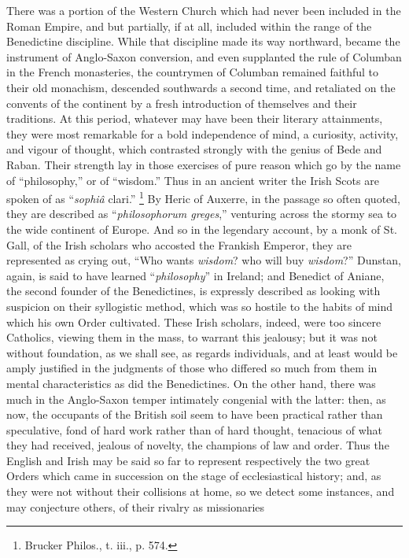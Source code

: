 There was a portion of the Western Church which had never been
included in the Roman Empire, and but partially, if at all, included
within the range of the Benedictine discipline. While that discipline
made its way northward, became the instrument of Anglo-Saxon
conversion, and even supplanted the rule of Columban in the French
monasteries, the countrymen of Columban remained faithful to their old
monachism, descended southwards a second time, and retaliated on the
convents of the continent by a fresh introduction of themselves and
their traditions. At this period, whatever may have been their
literary attainments, they were most remarkable for a bold
independence of mind, a curiosity, activity, and vigour of thought,
which contrasted strongly with the genius of Bede and Raban. Their
strength lay in those exercises of pure reason which go by the name of
``philosophy,'' or of ``wisdom.'' Thus in an ancient
writer the Irish Scots are spoken of as ``\emph{sophiâ} clari.''
\footnote{Brucker
Philos., t. iii., p. 574.} By Heric of Auxerre,
in the passage so often quoted, they are described as ``\emph{philosophorum
greges},'' venturing across the stormy sea to the wide
continent of Europe. And so in the legendary account, by a monk of St.
Gall, of the Irish scholars who accosted the Frankish Emperor, they
are represented as crying out, ``Who wants \emph{wisdom}? who will
buy \emph{wisdom}?'' Dunstan, again, is said to have learned
``\emph{philosophy}'' in Ireland; and Benedict of Aniane, the
second founder of the Benedictines, is expressly described as looking
with suspicion on their syllogistic method, which was so hostile
to the habits of mind which his own Order cultivated. These Irish
scholars, indeed, were too sincere Catholics, viewing them in the
mass, to warrant this jealousy; but it was not without foundation, as
we shall see, as regards individuals, and at least would be amply
justified in the judgments of those who differed so much from them in
mental characteristics as did the Benedictines. On the other hand,
there was much in the Anglo-Saxon temper intimately congenial with the
latter: then, as now, the occupants of the British soil seem to have
been practical rather than speculative, fond of hard work rather than
of hard thought, tenacious of what they had received, jealous of
novelty, the champions of law and order. Thus the English and Irish
may be said so far to represent respectively the two great Orders
which came in succession on the stage of ecclesiastical history; and,
as they were not without their collisions at home, so we detect some
instances, and may conjecture others, of their rivalry as missionaries

